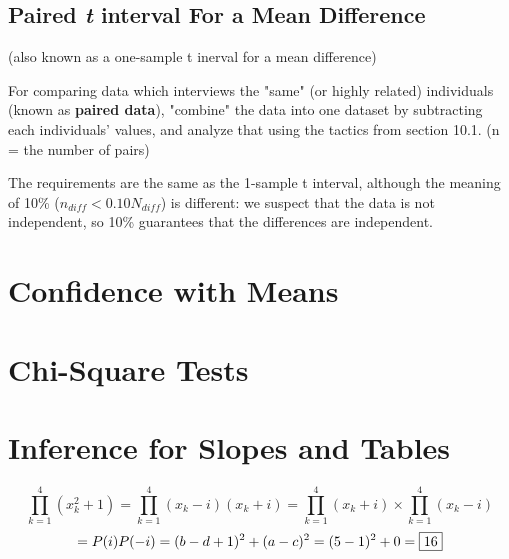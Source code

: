 \documentclass[12pt, a4paper]{article}
\theoremstyle{definition}
\begin{document}
\subsection{Paired \textit{t} interval For a Mean Difference}
(also known as a one-sample t inerval for a mean difference)

For comparing data which interviews the "same" (or highly related) individuals (known as \textbf{paired data}), "combine" the data into one dataset by subtracting each individuals' values, and analyze that using the tactics from section 10.1.
(n = the number of pairs)

The requirements are the same as the 1-sample t interval, although the meaning of 10\% ($n_{diff} < 0.10N_{diff}$) is different: we suspect that the data is not independent, so 10\% guarantees that the differences are independent.





\newpage

\section{Confidence with Means}

\newpage

\section{Chi-Square Tests}

\newpage

\section{Inference for Slopes and Tables}

\[\prod_{k=1}^{4}(x^2_k+1) = \prod_{k=1}^{4}(x_k-i)(x_k+i) = \prod_{k=1}^{4}(x_k + i) \times \prod_{k=1}^4(x_k - i)\]
\[= P(i)P(-i) = (b - d + 1)^2 + (a - c)^2 = (5 - 1)^2 + 0 = \fbox{16}\]
\end{document}
